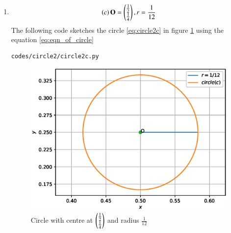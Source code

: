 \begin{enumerate}[label=\thesection.\arabic*.,ref=\thesection.\theenumi]
\item
\begin{align}
\left(c\right)\mathbf{O}=\begin{pmatrix}\frac{1}{2}\\\frac{1}{4}\end{pmatrix}, r=\frac{1}{12}
\label{eq:circle2c}
\end{align}
The following code sketches the circle \ref{eq:circle2c} in figure \ref{fig:circle2c} using the equation \ref{eq:eqn_of_circle}
\begin{lstlisting}
codes/circle2/circle2c.py
\end{lstlisting}
\begin{figure}[!ht]
\centering
\includegraphics[width=\columnwidth]{./codes/circle2/pyfigs/circle2c.eps}
\caption{Circle with centre at $\begin{pmatrix}\frac{1}{2}\\\frac{1}{4}\end{pmatrix}$ and radius $\frac{1}{12}$}
\label{fig:circle2c}
\end{figure}



\end{enumerate}
